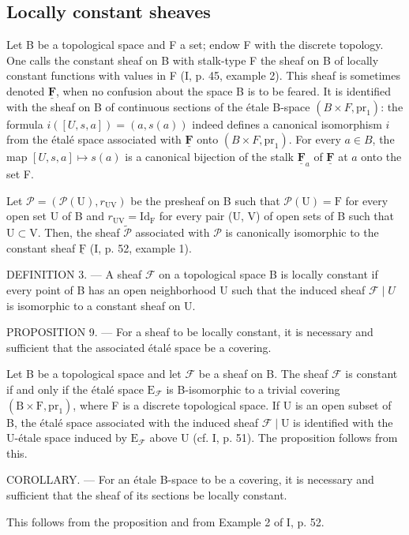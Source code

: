 \subsection{Locally constant sheaves}

Let B be a topological space and F a set; endow F with the discrete topology. One calls the constant sheaf on B with stalk-type F the sheaf on B of locally constant functions with values in F (I, p. 45, example 2). This sheaf is sometimes denoted \(\underline{\mathbf{F}}\), when no confusion about the space B is to be feared. It is identified with the sheaf on B of continuous sections of the étale B-space \((B \times F,\mathrm{pr}_1)\): the formula \(i([U,s,a]) = (a,s(a))\) indeed defines a canonical isomorphism \(i\) from the étalé space associated with \(\underline{\mathbf{F}}\) onto \((B \times F,\mathrm{pr}_1)\). For every \(a \in B\), the map \([U,s,a] \mapsto s(a)\) is a canonical bijection of the stalk \(\underline{\mathbf{F}}_a\) of \(\underline{\mathbf{F}}\) at \(a\) onto the set F.

Let \(\mathcal{P} = (\mathcal{P}(\mathrm{U}), r_{\mathrm{UV}})\) be the presheaf on B such that \(\mathcal{P}(\mathrm{U}) = \mathrm{F}\) for every open set U of B and \(r_{\mathrm{UV}} = \mathrm{Id}_{\mathrm{F}}\) for every pair (U, V) of open sets of B such that \(\mathrm{U} \subset \mathrm{V}\). Then, the sheaf \(\widetilde{\mathcal{P}}\) associated with \(\mathcal{P}\) is canonically isomorphic to the constant sheaf \(\underline{\mathrm{F}}\) (I, p. 52, example 1).

DEFINITION 3. --- A sheaf \(\mathcal{F}\) on a topological space B is locally constant if every point of B has an open neighborhood U such that the induced sheaf \(\mathcal{F} \mid U\) is isomorphic to a constant sheaf on U.

PROPOSITION 9. --- For a sheaf to be locally constant, it is necessary and sufficient that the associated étalé space be a covering.

Let B be a topological space and let \(\mathcal{F}\) be a sheaf on B. The sheaf \(\mathcal{F}\) is constant if and only if the étalé space \(\mathrm{E}_{\mathcal{F}}\) is B-isomorphic to a trivial covering \((\mathrm{B} \times \mathrm{F},\mathrm{pr}_1)\), where F is a discrete topological space. If U is an open subset of B, the étalé space associated with the induced sheaf \(\mathcal{F} \mid \mathrm{U}\) is identified with the U-étale space induced by \(\mathrm{E}_{\mathcal{F}}\) above U (cf. I, p. 51). The proposition follows from this.

COROLLARY. --- For an étale B-space to be a covering, it is necessary and sufficient that the sheaf of its sections be locally constant.

This follows from the proposition and from Example 2 of I, p. 52.

